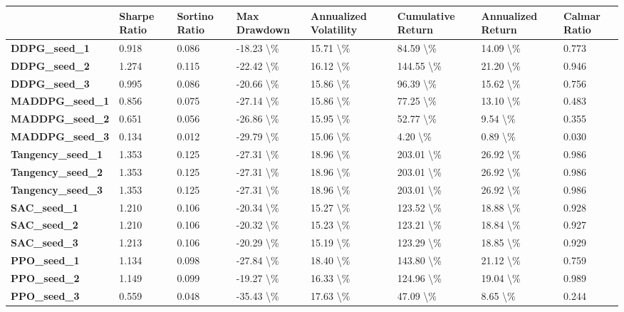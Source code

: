 \begin{tabular}{llllllll}
\toprule
 & Sharpe Ratio & Sortino Ratio & Max Drawdown & Annualized Volatility & Cumulative Return & Annualized Return & Calmar Ratio \\
\midrule
\textbf{DDPG\_seed\_1} & 0.918 & 0.086 & -18.23 \textbackslash \% & 15.71 \textbackslash \% & 84.59 \textbackslash \% & 14.09 \textbackslash \% & 0.773 \\
\textbf{DDPG\_seed\_2} & 1.274 & 0.115 & -22.42 \textbackslash \% & 16.12 \textbackslash \% & 144.55 \textbackslash \% & 21.20 \textbackslash \% & 0.946 \\
\textbf{DDPG\_seed\_3} & 0.995 & 0.086 & -20.66 \textbackslash \% & 15.86 \textbackslash \% & 96.39 \textbackslash \% & 15.62 \textbackslash \% & 0.756 \\
\textbf{MADDPG\_seed\_1} & 0.856 & 0.075 & -27.14 \textbackslash \% & 15.86 \textbackslash \% & 77.25 \textbackslash \% & 13.10 \textbackslash \% & 0.483 \\
\textbf{MADDPG\_seed\_2} & 0.651 & 0.056 & -26.86 \textbackslash \% & 15.95 \textbackslash \% & 52.77 \textbackslash \% & 9.54 \textbackslash \% & 0.355 \\
\textbf{MADDPG\_seed\_3} & 0.134 & 0.012 & -29.79 \textbackslash \% & 15.06 \textbackslash \% & 4.20 \textbackslash \% & 0.89 \textbackslash \% & 0.030 \\
\textbf{Tangency\_seed\_1} & 1.353 & 0.125 & -27.31 \textbackslash \% & 18.96 \textbackslash \% & 203.01 \textbackslash \% & 26.92 \textbackslash \% & 0.986 \\
\textbf{Tangency\_seed\_2} & 1.353 & 0.125 & -27.31 \textbackslash \% & 18.96 \textbackslash \% & 203.01 \textbackslash \% & 26.92 \textbackslash \% & 0.986 \\
\textbf{Tangency\_seed\_3} & 1.353 & 0.125 & -27.31 \textbackslash \% & 18.96 \textbackslash \% & 203.01 \textbackslash \% & 26.92 \textbackslash \% & 0.986 \\
\textbf{SAC\_seed\_1} & 1.210 & 0.106 & -20.34 \textbackslash \% & 15.27 \textbackslash \% & 123.52 \textbackslash \% & 18.88 \textbackslash \% & 0.928 \\
\textbf{SAC\_seed\_2} & 1.210 & 0.106 & -20.32 \textbackslash \% & 15.23 \textbackslash \% & 123.21 \textbackslash \% & 18.84 \textbackslash \% & 0.927 \\
\textbf{SAC\_seed\_3} & 1.213 & 0.106 & -20.29 \textbackslash \% & 15.19 \textbackslash \% & 123.29 \textbackslash \% & 18.85 \textbackslash \% & 0.929 \\
\textbf{PPO\_seed\_1} & 1.134 & 0.098 & -27.84 \textbackslash \% & 18.40 \textbackslash \% & 143.80 \textbackslash \% & 21.12 \textbackslash \% & 0.759 \\
\textbf{PPO\_seed\_2} & 1.149 & 0.099 & -19.27 \textbackslash \% & 16.33 \textbackslash \% & 124.96 \textbackslash \% & 19.04 \textbackslash \% & 0.989 \\
\textbf{PPO\_seed\_3} & 0.559 & 0.048 & -35.43 \textbackslash \% & 17.63 \textbackslash \% & 47.09 \textbackslash \% & 8.65 \textbackslash \% & 0.244 \\
\bottomrule
\end{tabular}
